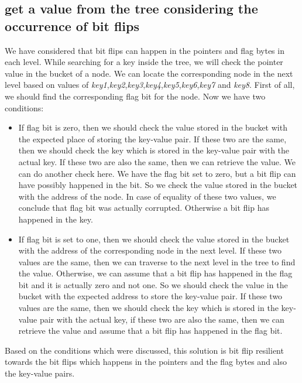 \documentclass[12pt]{report}
\begin{document}
\subsection{get a value from the tree considering the occurrence of bit flips }

We have considered that bit flips can happen in the pointers and flag bytes in each level. While searching for a key inside the tree, we will check the pointer value in the bucket of a node. We can locate the corresponding node in the next level based on values of \textit{key1},\textit{key2},\textit{key3},\textit{key4},\textit{key5},\textit{key6},\textit{key7} and \textit{key8}. First of all, we should find the corresponding flag bit for the node. Now we have two conditions:

\begin{itemize}

\item If flag bit is zero, then we should check the value stored in the bucket with the expected place of storing the key-value pair. If these two are the same, then we should check the key which is stored in the key-value pair with the actual key. If these two are also the same, then we can retrieve the value. We can do another check here. We have the flag bit set to zero, but a bit flip can have possibly happened in the bit. So we check the value stored in the bucket with the address of the node. In case of equality of these two values, we conclude that flag bit was actually corrupted. Otherwise a bit flip has happened in the key. 

\item If flag bit is set to one, then we should check the value stored in the bucket with the address of the corresponding node in the next level. If these two values are the same, then we can traverse to the next level in the tree to find the value. Otherwise, we can assume that a bit flip has happened in the flag bit and it is actually zero and not one. So we should check the value in the bucket with the expected address to store the key-value pair. If these two values are the same, then we should check the key which is stored in the key-value pair with the actual key, if these two are also the same, then we can retrieve the value and assume that a bit flip has happened in the flag bit.  
\end{itemize}

Based on the conditions which were discussed, this solution is bit flip resilient towards the bit flips which happens in the pointers and the flag bytes and also the key-value pairs.
\end{document}

